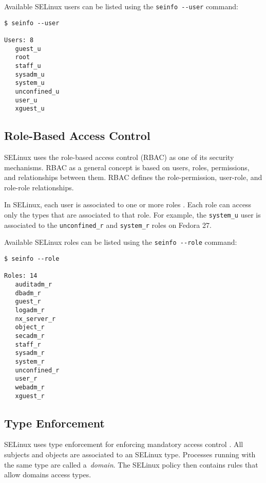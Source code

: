 \pagebreak

Available SELinux users can be listed using the \texttt{seinfo -{}-user}
command:
\begin{lstlisting}
$ seinfo --user

Users: 8
   guest_u
   root
   staff_u
   sysadm_u
   system_u
   unconfined_u
   user_u
   xguest_u
\end{lstlisting}

\subsection{Role-Based Access Control}
\label{rbac}
SELinux uses the role-based access control (RBAC) as one of its security
mechanisms. RBAC as a general concept is based on users, roles, permissions,
and relationships between them. RBAC defines the role-permission, user-role, and
role-role relationships.

In SELinux, each user is associated to one or more roles \cite[p.~24]{tsn}.
Each role can access only the types that are associated to that role. For
example, the \texttt{system\_u} user is associated to the
\texttt{unconfined\_r} and \texttt{system\_r} roles on Fedora 27.

Available SELinux roles can be listed using the \texttt{seinfo -{}-role}
command:
\begin{lstlisting}
$ seinfo --role

Roles: 14
   auditadm_r
   dbadm_r
   guest_r
   logadm_r
   nx_server_r
   object_r
   secadm_r
   staff_r
   sysadm_r
   system_r
   unconfined_r
   user_r
   webadm_r
   xguest_r
\end{lstlisting}

\subsection{Type Enforcement}
\label{te}
SELinux uses type enforcement for enforcing mandatory access control
\cite[pp.~25--26]{tsn}. All subjects and objects are associated to an SELinux
type. Processes running with the same type are called a~\emph{domain}. The
SELinux policy then contains rules that allow domains access types.

